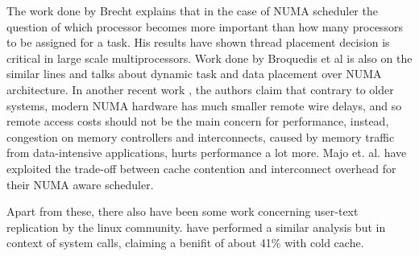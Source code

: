 The work done by Brecht \cite{Brecht:1993:IPA:1295480.1295481} explains that in the case of 
NUMA scheduler the question of which processor becomes more important than how many processors to be assigned for a task.
His results have shown thread placement decision is critical in large scale multiprocessors.
Work done by Broquedis et al \cite{numaScheduling} is also on the similar lines and talks about
dynamic task and data placement over NUMA architecture.
In another recent work \cite{Dashti:2013:TMH:2490301.2451157}, the authors claim that contrary to 
older systems, modern NUMA hardware has much smaller remote wire delays, and so remote access
costs should not be the main concern for performance, instead, 
congestion on memory controllers and interconnects, caused by memory traffic from 
data-intensive applications, hurts performance a lot more.
Majo et. al. \cite{Majo:2011:MMN:1993478.1993481} have exploited the trade-off 
between cache contention and interconnect overhead for their NUMA aware scheduler.

Apart from these, there also have been some work concerning user-text replication by the
linux community. \cite{textReplication} have performed a similar analysis but in context of
system calls, claiming a benifit of about 41\% with cold cache.

